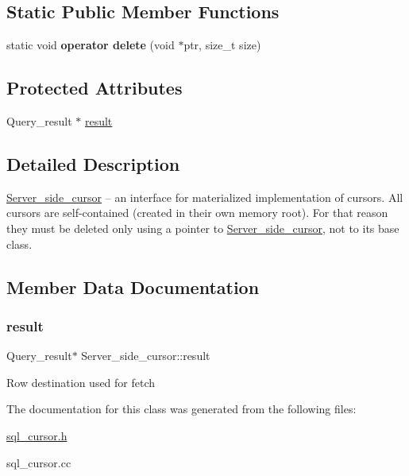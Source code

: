 \subsection*{Static Public Member Functions}
\begin{DoxyCompactItemize}
\item 
\mbox{\label{classServer__side__cursor_a159d55dd11e6bf01de97e0f4c535ca58}} 
static void {\bfseries operator delete} (void $\ast$ptr, size\+\_\+t size)
\end{DoxyCompactItemize}
\subsection*{Protected Attributes}
\begin{DoxyCompactItemize}
\item 
Query\+\_\+result $\ast$ \mbox{\hyperlink{classServer__side__cursor_aabbf3cb174ae4f57cc7bfc35f9149c25}{result}}
\end{DoxyCompactItemize}


\subsection{Detailed Description}
\mbox{\hyperlink{classServer__side__cursor}{Server\+\_\+side\+\_\+cursor}} -- an interface for materialized implementation of cursors. All cursors are self-\/contained (created in their own memory root). For that reason they must be deleted only using a pointer to \mbox{\hyperlink{classServer__side__cursor}{Server\+\_\+side\+\_\+cursor}}, not to its base class. 

\subsection{Member Data Documentation}
\mbox{\label{classServer__side__cursor_aabbf3cb174ae4f57cc7bfc35f9149c25}} 
\subsubsection{\texorpdfstring{result}{result}}
{\footnotesize\ttfamily Query\+\_\+result$\ast$ Server\+\_\+side\+\_\+cursor\+::result\hspace{0.3cm}{\ttfamily [protected]}}

Row destination used for fetch 

The documentation for this class was generated from the following files\+:\begin{DoxyCompactItemize}
\item 
\mbox{\hyperlink{sql__cursor_8h}{sql\+\_\+cursor.\+h}}\item 
sql\+\_\+cursor.\+cc\end{DoxyCompactItemize}
